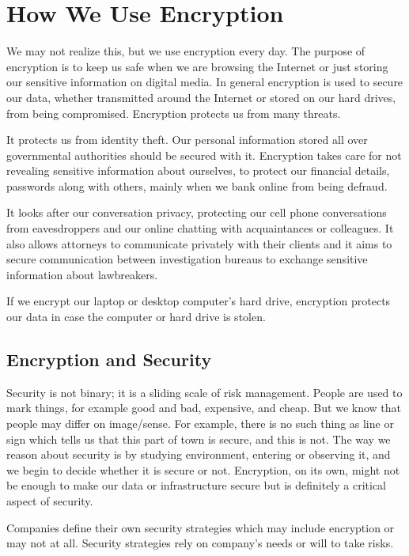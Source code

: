 \chapter{How We Use Encryption}\label{encryption}

We may not realize this, but we use encryption every day.
The purpose of encryption is to keep us safe when we are browsing the Internet or just storing our sensitive information on digital media.
In general encryption is used to secure our data, whether transmitted around the Internet or stored on our hard drives, from being compromised.
Encryption protects us from many threats.

It protects us from identity theft.
Our personal information stored all over governmental authorities should be secured with it.
Encryption takes care for not revealing sensitive information about ourselves, to protect our financial details, passwords along with others, mainly when we bank online from being defraud.

It looks after our conversation privacy, protecting our cell phone conversations from eavesdroppers and our online chatting with acquaintances or colleagues.
It also allows attorneys to communicate privately with their clients and it aims to secure communication between investigation bureaus to exchange sensitive information about lawbreakers.

If we encrypt our laptop or desktop computer's hard drive, encryption protects our data in case the computer or hard drive is stolen.



\section{Encryption and Security}

Security is not binary; it is a sliding scale of risk management.
People are used to mark things, for example good and bad, expensive, and cheap.
But we know that people may differ on image/sense.
For example, there is no such thing as line or sign which tells us that this part of town is secure, and this is not.
The way we reason about security is by studying environment, entering or observing it, and we begin to decide whether it is secure or not.
Encryption, on its own, might not be enough to make our data or infrastructure secure but is definitely a critical aspect of security.

Companies define their own security strategies which may include encryption or may not at all.
Security strategies rely on company's needs or will to take risks.

